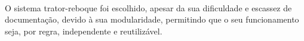 \paragraph{}O sistema trator-reboque foi escolhido, apesar da sua dificuldade e escassez de documentação, 
devido à sua modularidade, permitindo que o seu funcionamento seja, por regra, independente e reutilizável.


